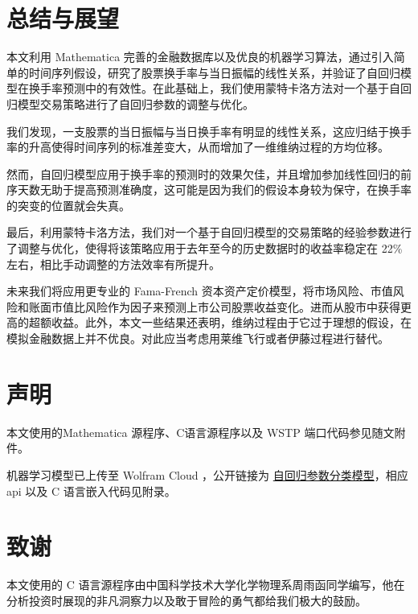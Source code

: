 \documentclass{ctexart}
\newcommand{\0}{\boldsymbol{0}}
\begin{document}
\section{总结与展望}

本文利用 Mathematica 完善的金融数据库以及优良的机器学习算法，通过引入简单的时间序列假设，研究了股票换手率与当日振幅的线性关系，并验证了自回归模型在换手率预测中的有效性。在此基础上，我们使用蒙特卡洛方法对一个基于自回归模型交易策略进行了自回归参数的调整与优化。

我们发现，一支股票的当日振幅与当日换手率有明显的线性关系，这应归结于换手率的升高使得时间序列的标准差变大，从而增加了一维维纳过程的方均位移。

然而，自回归模型应用于换手率的预测时的效果欠佳，并且增加参加线性回归的前序天数无助于提高预测准确度，这可能是因为我们的假设本身较为保守，在换手率的突变的位置就会失真。

最后，利用蒙特卡洛方法，我们对一个基于自回归模型的交易策略的经验参数进行了调整与优化，使得将该策略应用于去年至今的历史数据时的收益率稳定在 22\% 左右，相比手动调整的方法效率有所提升。

未来我们将应用更专业的 Fama-French 资本资产定价模型，将市场风险、市值风险和账面市值比风险作为因子来预测上市公司股票收益变化。进而从股市中获得更高的超额收益。此外，本文一些结果还表明，维纳过程由于它过于理想的假设，在模拟金融数据上并不优良。对此应当考虑用莱维飞行或者伊藤过程进行替代。

\section{声明}

本文使用的Mathematica 源程序、C语言源程序以及 WSTP 端口代码参见随文附件。

机器学习模型已上传至 Wolfram Cloud ，公开链接为 \href{https://www.wolframcloud.com/obj/617a368e-36b5-4bb7-b4dc-ea6a933ed0f6}{\kaishu 自回归参数分类模型}，相应 api 以及 C 语言嵌入代码见附录。


\section{致谢}

本文使用的 C 语言源程序由中国科学技术大学化学物理系周雨函同学编写，他在分析投资时展现的非凡洞察力以及敢于冒险的勇气都给我们极大的鼓励。

\pagebreak



\pagebreak

\kaishu
\end{document}
